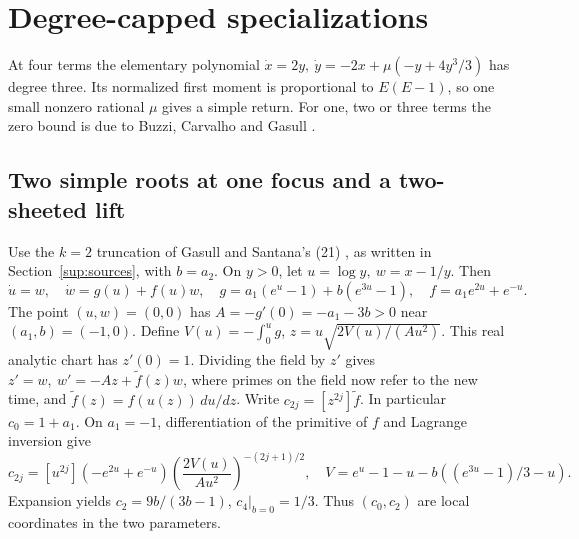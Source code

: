 \section{Degree-capped specializations}\label{sup:cap}
At four terms the elementary polynomial \(\dot x=2y,\ \dot y=-2x+\mu(-y+4y^3/3)\) has degree three. Its normalized first moment is proportional to \(E(E-1)\), so one small nonzero rational \(\mu\) gives a simple return. For one, two or three terms the zero bound is due to Buzzi, Carvalho and Gasull \cite[Theorem~1.2]{BuzziCarvalhoGasull2021}.

\subsection{Two simple roots at one focus and a two-sheeted lift}\label{sup:focus}
Use the \(k=2\) truncation of Gasull and Santana's (21) \cite[pp.~11--12]{GasullSantana2024}, as written in Section~\ref{sup:sources}, with \(b=a_2\). On \(y>0\), let \(u=\log y,\ w=x-1/y\). Then
\[
 \dot u=w,\quad \dot w=g(u)+f(u)w,\quad
 g=a_1(e^u-1)+b(e^{3u}-1),\quad f=a_1e^{2u}+e^{-u}.
\]
The point \((u,w)=(0,0)\) has \(A=-g'(0)=-a_1-3b>0\) near \((a_1,b)=(-1,0)\). Define \(V(u)=-\int_0^ug\), \(z=u\sqrt{2V(u)/(Au^2)}\). This real analytic chart has \(z'(0)=1\). Dividing the field by \(z'\) gives \(z'=w,\ w'=-Az+\widetilde f(z)w\), where primes on the field now refer to the new time, and \(\widetilde f(z)=f(u(z))\,du/dz\). Write \(c_{2j}=[z^{2j}]\widetilde f\). In particular \(c_0=1+a_1\). On \(a_1=-1\), differentiation of the primitive of \(f\) and Lagrange inversion give
\[
 c_{2j}=[u^{2j}](-e^{2u}+e^{-u})
 \left(\frac{2V(u)}{Au^2}\right)^{-(2j+1)/2},\quad
 V=e^u-1-u-b((e^{3u}-1)/3-u).
\]
\hypertarget{focus-jet-coefficients}{Expansion yields} \(c_2=9b/(3b-1)\), \(c_4|_{b=0}=1/3\). Thus \((c_0,c_2)\) are local coordinates in the two parameters. 

